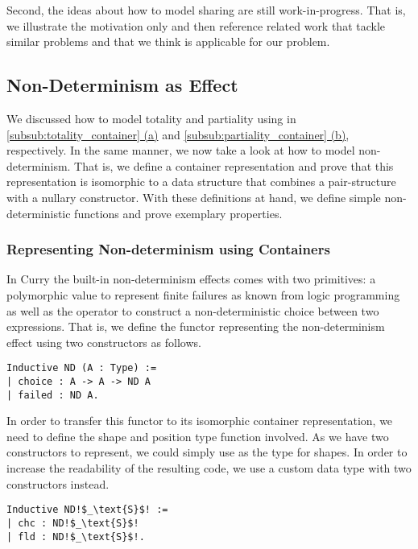 Second, the ideas about how to model sharing are still work\--in\--progress.
That is, we illustrate the motivation only and then reference related work that tackle similar problems and that we think is applicable for our problem.

\subsection{Non\--Determinism as Effect}

We discussed how to model totality and partiality using  in \hyperref[subsub:totality_container]{\autoref{subsub:totality_container} (a)} and \hyperref[subsub:partiality_container]{\autoref{subsub:partiality_container} (b)}, respectively.
In the same manner, we now take a look at how to model non\--determinism.
That is, we define a container representation and prove that this representation is isomorphic to a data structure that combines a pair\--structure with a nullary constructor.
With these definitions at hand, we define simple non\--deterministic functions and prove exemplary properties.

\subsubsection{Representing Non\--determinism using Containers}
\label{subsubsec:nondetContainter}

In Curry the built\--in non\--determinism effects comes with two primitives: a polymorphic value  to represent finite failures as known from logic programming as well as the operator  to construct a non\--deterministic choice between two expressions.
That is, we define the functor representing the non\--determinism effect using two constructors as follows. 

\begin{verbatim}
Inductive ND (A : Type) :=
| choice : A -> A -> ND A
| failed : ND A.
\end{verbatim}

In order to transfer this functor to its isomorphic container representation, we need to define the shape and position type function involved.
As we have two constructors to represent, we could simply use  as the type for shapes.
In order to increase the readability of the resulting code, we use a custom data type with two constructors instead.

\begin{verbatim}
Inductive ND!$_\text{S}$! :=
| chc : ND!$_\text{S}$!
| fld : ND!$_\text{S}$!.
\end{verbatim}

